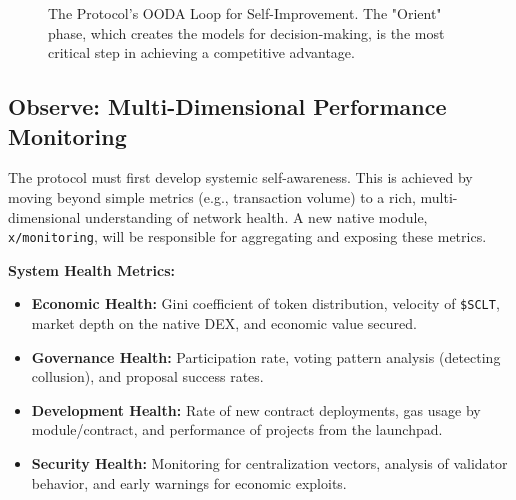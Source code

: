 \documentclass[10pt]{article}
\begin{document}
\begin{figure}[H]
\centering
{}
\caption{The Protocol's OODA Loop for Self-Improvement. The "Orient" phase, which creates the models for decision-making, is the most critical step in achieving a competitive advantage.}
\label{fig:ooda_loop}
\end{figure}

\subsection{Observe: Multi-Dimensional Performance Monitoring}
The protocol must first develop systemic self-awareness. This is achieved by moving beyond simple metrics (e.g., transaction volume) to a rich, multi-dimensional understanding of network health. A new native module, \texttt{x/monitoring}, will be responsible for aggregating and exposing these metrics.

\textbf{System Health Metrics:}
\begin{itemize}[leftmargin=*, itemsep=2pt]
    \item \textbf{Economic Health:} Gini coefficient of token distribution, velocity of \texttt{\$SCLT}, market depth on the native DEX, and economic value secured.
    \item \textbf{Governance Health:} Participation rate, voting pattern analysis (detecting collusion), and proposal success rates.
    \item \textbf{Development Health:} Rate of new contract deployments, gas usage by module/contract, and performance of projects from the launchpad.
    \item \textbf{Security Health:} Monitoring for centralization vectors, analysis of validator behavior, and early warnings for economic exploits.
\end{itemize}
\end{document}
